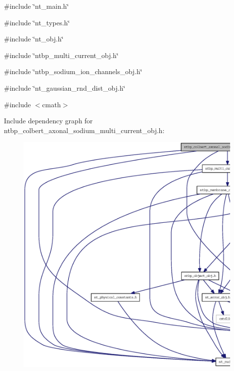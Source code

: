 {\ttfamily \#include \char`\"{}nt\_\-main.h\char`\"{}}\par
{\ttfamily \#include \char`\"{}nt\_\-types.h\char`\"{}}\par
{\ttfamily \#include \char`\"{}nt\_\-obj.h\char`\"{}}\par
{\ttfamily \#include \char`\"{}ntbp\_\-multi\_\-current\_\-obj.h\char`\"{}}\par
{\ttfamily \#include \char`\"{}ntbp\_\-sodium\_\-ion\_\-channels\_\-obj.h\char`\"{}}\par
{\ttfamily \#include \char`\"{}nt\_\-gaussian\_\-rnd\_\-dist\_\-obj.h\char`\"{}}\par
{\ttfamily \#include $<$cmath$>$}\par
Include dependency graph for ntbp\_\-colbert\_\-axonal\_\-sodium\_\-multi\_\-current\_\-obj.h:
\nopagebreak
\begin{figure}[H]
\begin{center}
\leavevmode
\includegraphics[width=400pt]{ntbp__colbert__axonal__sodium__multi__current__obj_8h__incl}
\end{center}
\end{figure}
